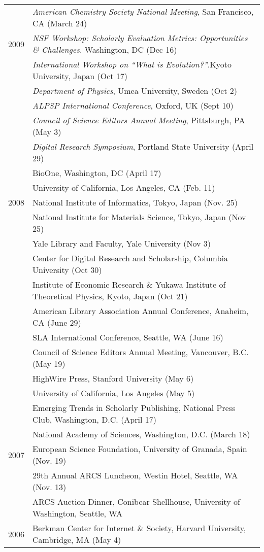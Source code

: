 \documentclass[11pt]{article}
\begin{document}
\begin{longtable}{p{0.5in}|p{5.5in}}
  		&  \textit{American Chemistry Society National Meeting}, San Francisco, CA (March 24) \\
  2009	&  \textit{NSF Workshop: Scholarly Evaluation Metrics: Opportunities \& Challenges}. Washington, DC (Dec 16) \\
  		  &  \textit{International Workshop on “What is Evolution?”}.Kyoto University, Japan (Oct 17) \\
  		  & \textit{Department of Physics}, Umea University, Sweden (Oct 2) \\
  		  & \textit{ALPSP International Conference}, Oxford, UK (Sept 10) \\
  		  & \textit{Council of Science Editors Annual Meeting}, Pittsburgh, PA (May 3) \\
  		  & \textit{Digital Research Symposium}, Portland State University (April 29) \\
  		  & BioOne, Washington, DC (April 17) \\
  		  & University of California, Los Angeles, CA (Feb. 11) \\
  2008  & National Institute of Informatics, Tokyo, Japan (Nov. 25) \\ 
 		    & National Institute for Materials Science, Tokyo, Japan (Nov 25) \\
  		  & Yale Library and Faculty, Yale University (Nov 3) \\
  		  & Center for Digital Research and Scholarship, Columbia University (Oct 30) \\
  		  & Institute of Economic Research \& Yukawa Institute of Theoretical Physics, Kyoto, Japan (Oct 21) \\
  		  & American Library Association Annual Conference, Anaheim, CA (June 29) \\
  		  & SLA International Conference, Seattle, WA (June 16) \\
  		  & Council of Science Editors Annual Meeting, Vancouver, B.C. (May 19) \\
  		  & HighWire Press, Stanford University (May 6) \\
  		  & University of California, Los Angeles (May 5) \\
  		  & Emerging Trends in Scholarly Publishing, National Press Club, Washington, D.C. (April 17) \\
  		  & National Academy of Sciences, Washington, D.C. (March 18) \\
  2007	& European Science Foundation, University of Granada, Spain (Nov. 19) \\
  		  & 29th Annual ARCS Luncheon, Westin Hotel, Seattle, WA (Nov. 13) \\
  		  & ARCS Auction Dinner, Conibear Shellhouse, University of Washington, Seattle, WA \\
  2006  & Berkman Center for Internet \& Society, Harvard University, Cambridge, MA (May 4) \\
\end{longtable}
\end{document}
